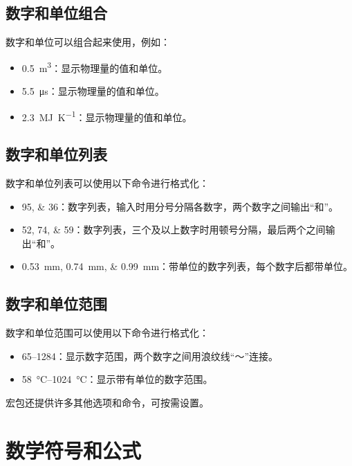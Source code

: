 \subsection{数字和单位组合}

数字和单位可以组合起来使用，例如：

\begin{itemize}
  \item \SI{0.5}{\metre\cubed}：显示物理量的值和单位。
  \item \SI{5.5}{\micro\second}：显示物理量的值和单位。
  \item \SI{2.3}{\mega\joule\per\kelvin}：显示物理量的值和单位。
\end{itemize}

\subsection{数字和单位列表}

数字和单位列表可以使用以下命令进行格式化：

\begin{itemize}
  \item \numlist{95;36}：数字列表，输入时用分号分隔各数字，两个数字之间输出“和”。
  \item \numlist{52;74;59}：数字列表，三个及以上数字时用顿号分隔，最后两个之间输出“和”。
  \item \SIlist{0.53;0.74;0.99}{\milli\metre}：带单位的数字列表，每个数字后都带单位。
\end{itemize}

\subsection{数字和单位范围}

数字和单位范围可以使用以下命令进行格式化：

\begin{itemize}
  \item \numrange{65}{1284}：显示数字范围，两个数字之间用浪纹线“～”连接。
  \item \SIrange{58}{1024}{\degreeCelsius}：显示带有单位的数字范围。
\end{itemize}

 宏包还提供许多其他选项和命令，可按需设置。

\section{数学符号和公式}

